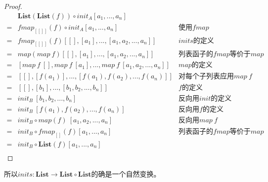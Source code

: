 \documentclass[b5paper]{ctexart}
\begin{document}
\begin{example}
\begin{proof}
\[
\begin{array}{cll}
  & \mathbf{List}(\mathbf{List}(f)) \circ init_A [a_1, ..., a_n] & \\
= & fmap_{[[]]}(f) \circ init_A [a_1, ..., a_n] & \text{使用$fmap$} \\
= & fmap_{[[]]}(f) [[], [a_1], ..., [a_1, a_2, ..., a_n]] & \text{$inits$的定义} \\
= & map(map\ f) [[], [a_1], ..., [a_1, a_2, ..., a_n]] & \text{列表函子的$fmap$等价于$map$} \\
= & [map\ f\ [], map\ f\ [a_1], ..., map\ f\ [a_1, a_2, ..., a_n]] & \text{$map$的定义} \\
= & [[], [f(a_1)], ..., [f(a_1), f(a_2), ..., f(a_n)]] & \text{对每个子列表应用$map\ f$} \\
= & [[], [b_1], ..., [b_1, b_2, ..., b_n]] & \text{$f$的定义} \\
= & init_B\ [b_1, b_2, ..., b_n] & \text{反向用$init$的定义} \\
= & init_B\ [f(a_1), f(a_2), ..., f(a_n)] & \text{反向用$f$的定义} \\
= & init_B \circ map(f)\ [a_1, a_2, ..., a_n] & \text{反向用$map\ f$} \\
= & init_B \circ fmap_{[]}(f) [a_1, ..., a_n] & \text{列表函子的$fmap$等价于$map$} \\
= & init_B \circ \mathbf{List}(f) [a_1, ..., a_n] & \\
\end{array}
\]
\end{proof}

所以$inits : \mathbf{List} \to \mathbf{List} \circ \mathbf{List}$的确是一个自然变换。
\end{example}
\end{document}
